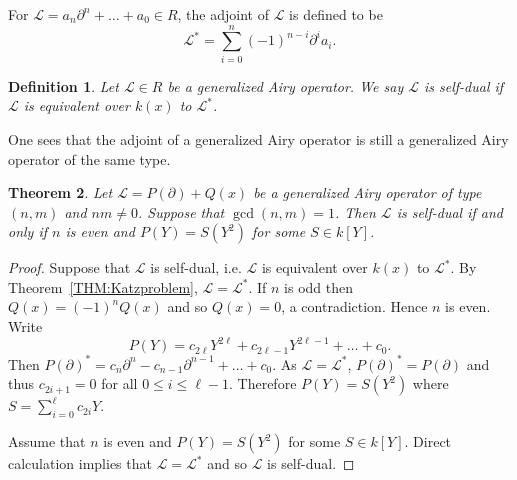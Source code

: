 \documentclass{article}
\newtheorem{theorem}{Theorem}[section]
\newtheorem{definition}[theorem]{Definition}
\newcommand{\pa}{\partial}
\newcommand{\calL}{{\mathcal{L}}}
\begin{document}
For $\calL=a_n\pa^n+\dots+a_0\in R$, the adjoint of $\calL$ is defined to be 
$$
    \calL^*=\sum_{i=0}^n (-1)^{n-i} \pa^i a_i.
$$
\begin{definition}
  Let $\calL\in R$ be a generalized Airy operator. We say $\calL$ is self-dual if $\calL$ is equivalent over $k(x)$ to $\calL^*$.
\end{definition}
One sees that the adjoint of a generalized Airy operator is still a generalized Airy operator of the same type.
\begin{theorem}
  \label{THM:self-dual}
 Let $\calL=P(\partial)+Q(x)$ be a generalized Airy operator of type $(n,m)$ and $nm\neq 0$. Suppose that $\gcd(n,m)=1$. Then 
 $\calL$ is self-dual if and only if $n$ is even and $P(Y)=S(Y^2)$ for some $S\in k[Y]$.
\end{theorem}
\begin{proof}
  Suppose that $\calL$ is self-dual, i.e. $\calL$ is equivalent over $k(x)$ to $\calL^*$. By Theorem~\ref{THM:Katzproblem},
  $\calL=\calL^*$. If $n$ is odd then $Q(x)=(-1)^nQ(x)$ and so $Q(x)=0$, a contradiction. Hence $n$ is even. Write 
  $$
     P(Y)=c_{2\ell}Y^{2\ell}+c_{2\ell-1}Y^{2\ell-1}+\dots+c_0.
  $$
  Then $P(\pa)^*=c_n\pa^n-c_{n-1}\pa^{n-1}+\dots+c_0$. As $\calL=\calL^*$, $P(\pa)^*=P(\pa)$ and thus $c_{2i+1}=0$ for all $0\leq i \leq \ell-1$.
  Therefore $P(Y)=S(Y^2)$ where $S=\sum_{i=0}^\ell c_{2i}Y$.

  Assume that $n$ is even and $P(Y)=S(Y^2)$ for some $S\in k[Y]$. Direct calculation implies that $\calL=\calL^*$ and so $\calL$ is self-dual.
\end{proof}


\end{document}
